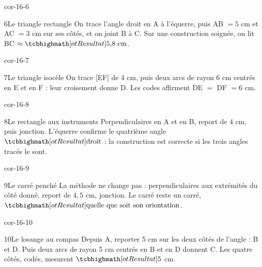 \begin{blocLivre}{cor-16-6}\begin{corrige}{6}{Le triangle rectangle}
On trace l’angle droit en A à l’équerre, puis AB $=5$ cm et AC $=3$ cm sur ses côtés, et on joint B à C. Sur une construction soignée, on lit BC $\approx\res{5{,}8\ \mathrm{cm}}$.
\label{fig-cor-16-6}
\end{corrige}\end{blocLivre}
\begin{blocLivre}{cor-16-7}\begin{corrige}{7}{Le triangle isocèle}
On trace [EF] de 4 cm, puis deux arcs de rayon 6 cm centrés en E et en F : leur croisement donne D. Les codes affirment DE $=$ DF $=6$ cm.
\label{fig-cor-16-7}
\end{corrige}\end{blocLivre}
\begin{blocLivre}{cor-16-8}\begin{corrige}{8}{Le rectangle aux instruments}
Perpendiculaires en A et en B, report de 4 cm, puis jonction. L’équerre confirme le quatrième angle $\res{\text{droit}}$ : la construction est correcte si les trois angles tracés le sont.
\label{fig-cor-16-8}
\end{corrige}\end{blocLivre}
\begin{blocLivre}{cor-16-9}\begin{corrige}{9}{Le carré penché}
La méthode ne change pas : perpendiculaires aux extrémités du côté donné, report de $4{,}5$ cm, jonction. Le carré reste un carré, $\res{\text{quelle que soit son orientation}}$.
\label{fig-cor-16-9}
\end{corrige}\end{blocLivre}
\begin{blocLivre}{cor-16-10}\begin{corrige}{10}{Le losange au compas}
Depuis A, reporter 5 cm sur les deux côtés de l’angle : B et D. Puis deux arcs de rayon 5 cm centrés en B et en D donnent C. Les quatre côtés, codés, mesurent $\res5$ cm.
\label{fig-cor-16-10}
\end{corrige}\end{blocLivre}
